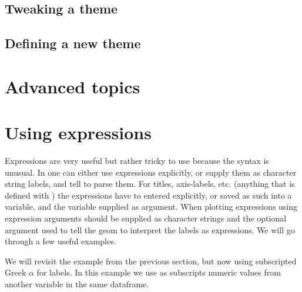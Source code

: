 \documentclass[paper=a4,10pt,div=17,headsepline,BCOR=12mm,twoside,open=right]{scrbook}\usepackage{knitr}
\begin{document}
\subsection{Tweaking a theme}
\subsection{Defining a new theme}

\section{Advanced topics}

\section{Using  expressions}

Expressions are very useful but rather tricky to use because the syntax is unusual. In  one can either use expressions explicitly, or supply them as character string labels, and tell  to parse them. For titles, axis-labels, etc. (anything that is defined with ) the expressions have to entered explicitly, or saved as such into a variable, and the variable supplied as argument. When plotting expressions using  expression arguments should be supplied as character strings and the optional argument  used to tell the geom to interpret the labels as expressions. We will go through a few useful examples.

We will revisit the example from the previous section, but now using subscripted Greek $\alpha$ for labels. In this example we use as subscripts numeric values from another variable in the same dataframe.
\end{document}
